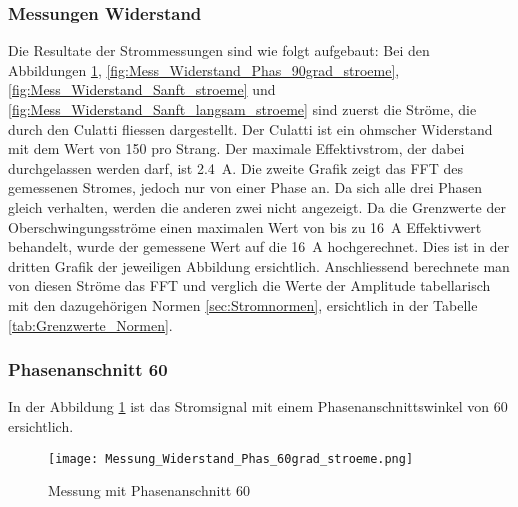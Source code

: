 \subsubsection{Messungen Widerstand}

Die Resultate der Strommessungen sind wie folgt aufgebaut: Bei den Abbildungen \ref{fig:Mess_Widerstand_Phas_60grad_stroeme}, \ref{fig:Mess_Widerstand_Phas_90grad_stroeme}, \ref{fig:Mess_Widerstand_Sanft_stroeme} und \ref{fig:Mess_Widerstand_Sanft_langsam_stroeme} sind zuerst die Ströme, die durch den Culatti fliessen dargestellt. Der Culatti ist ein ohmscher Widerstand mit dem Wert von \SI{150}{\Omega} pro Strang. Der maximale Effektivstrom, der dabei durchgelassen werden darf, ist \SI{2.4}{A}. Die zweite Grafik zeigt das FFT des gemessenen Stromes, jedoch nur von einer Phase an. Da sich alle drei Phasen gleich verhalten, werden die anderen zwei nicht angezeigt. Da die Grenzwerte der Oberschwingungsströme einen maximalen Wert von bis zu \SI{16}{A} Effektivwert behandelt, wurde der gemessene Wert auf die \SI{16}{A} hochgerechnet. Dies ist in der dritten Grafik der jeweiligen Abbildung ersichtlich. Anschliessend berechnete man von diesen Ströme das FFT und verglich die Werte der Amplitude tabellarisch mit den dazugehörigen Normen \ref{sec:Stromnormen}, ersichtlich in der Tabelle \ref{tab:Grenzwerte_Normen}.

\subsubsection*{Phasenanschnitt 60\textdegree}

In der Abbildung \ref{fig:Mess_Widerstand_Phas_60grad_stroeme} ist das Stromsignal mit einem Phasenanschnittswinkel von 60\textdegree \hspace{0.02cm} ersichtlich. 

\begin{figure}[ht!]
	\centering
	\texttt{[image: Messung\_Widerstand\_Phas\_60grad\_stroeme.png]}	
	\caption{Messung mit Phasenanschnitt 60\textdegree}\label{fig:Mess_Widerstand_Phas_60grad_stroeme}
\end{figure}


